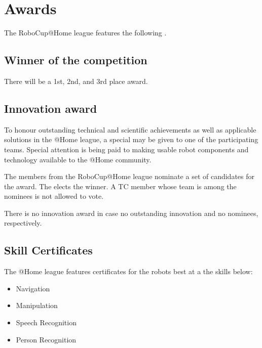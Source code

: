 \section{Awards}
The RoboCup@Home league features the following .

\subsection{Winner of the competition}
There will be a 1st, 2nd, and 3rd place award.

\subsection{Innovation award}
\label{arward:innovation}
To honour outstanding technical and scientific achievements as well as applicable solutions in the @Home league, a special  may be given to one of the participating teams. Special attention is being paid to making usable robot components and technology available to the @Home community.

The  members from the RoboCup@Home league nominate a set of candidates for the award. The  elects the winner. A TC member whose team is among the nominees is not allowed to vote.

There is no innovation award in case no outstanding innovation and no nominees, respectively.

%

\subsection{Skill Certificates}
  \label{award:skill}
  The @Home league features certificates for the robots best at a the skills below:
  \begin{itemize}
   \item Navigation
   \item Manipulation
   \item Speech Recognition
   \item Person Recognition
  \end{itemize}
  
